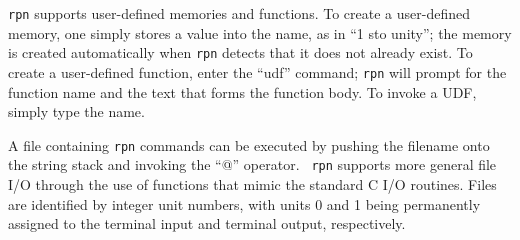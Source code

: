 \documentclass[11pt]{article}
\begin{document}
{\tt rpn} supports user-defined memories and functions.  To create a
user-defined memory, one simply stores a value into the name, as in
``1 sto unity''; the memory is created automatically when {\tt rpn}
detects that it does not already exist.  To create a user-defined
function, enter the ``udf'' command; {\tt rpn} will prompt for the
function name and the text that forms the function body.  To invoke a
UDF, simply type the name.

A file containing {\tt rpn} commands can be executed by pushing the
filename onto the string stack and invoking the ``@'' operator.  {\tt
rpn} supports more general file I/O through the use of functions that
mimic the standard C I/O routines.  Files are identified by integer
unit numbers, with units 0 and 1 being permanently assigned to the
terminal input and terminal output, respectively.
\end{document}
